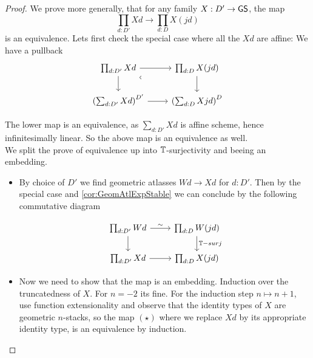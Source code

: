\begin{proof}
We prove more generally, that for any family $X :D' \to \mathsf{GS}$, the map
\[
\prod_{d:D'} X d \to \prod_{d:D} X (j d) \tag{$\star$}
\]
is an equivalence. Lets first check the special case where all the $X d$ are affine: We have a pullback
\[\begin{tikzcd}
	{\prod_{d:D'} X d } & {\prod_{d:D} X (j d) } \\
	{\left (\sum_{d:D'}X d \right)^{D'}} & {\left (\sum_{d:D} X j d \right)^{D}}
	\arrow[from=1-1, to=1-2]
	\arrow[from=1-1, to=2-1]
	\arrow["\ulcorner"{anchor=center, pos=0.125, rotate=45}, draw=none, from=1-1, to=2-2]
	\arrow[from=1-2, to=2-2]
	\arrow[from=2-1, to=2-2]
\end{tikzcd}\]

The lower map is an equivalence, as $\sum_{d :D'} X d$ is affine scheme, hence infinitesimally linear. So the above map is an equivalence as well. \\
We split the prove of equivalence up into $\mathbb{T}$-surjectivity and beeing an embedding.
\begin{itemize}
	\item
By choice of $D'$ we find geometric atlasses $W d \to X d$ for $d :D'$.
Then by the special case and \ref{cor:GeomAtlExpStable} we can conclude by the following commutative diagram

\[\begin{tikzcd}
	{\prod_{d :D'}W d} & {\prod_{d : D} W(jd)} \\
	{\prod_{d :D'} X d} & {\prod_{d : D} X(jd)}
	\arrow["\sim", from=1-1, to=1-2]
	\arrow[from=1-1, to=2-1]
	\arrow["{\bT -surj}", from=1-2, to=2-2]
	\arrow[from=2-1, to=2-2]
\end{tikzcd}\]
\item
Now we need to show that the map is an embedding. Induction over the truncatedness of $X$. For $n=-2$ its fine.
For the induction step $n \mapsto n+1$, use function extensionality and observe that the identity types of $X$ are geometric $n$-stacks, so the map $(\star)$ where we replace $X d$ by its appropriate identity type, is an equivalence by induction.
\end{itemize}
\end{proof}
